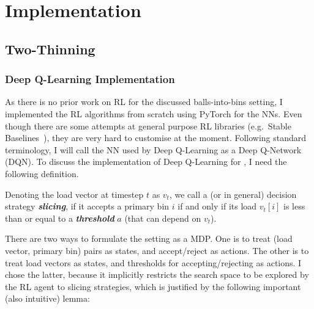 \chapter{Implementation}\label{implementation}

\ifpdf
    \graphicspath{{Chapter3/Figs/Raster/}{Chapter3/Figs/PDF/}{Chapter3/Figs/}}
\else
    \graphicspath{{Chapter3/Figs/Vector/}{Chapter3/Figs/}}
\fi



\section{Two-Thinning}





\subsection{Deep Q-Learning Implementation}


As there is no prior work on RL for the discussed balls-into-bins setting, I implemented the RL algorithms from scratch using PyTorch for the NNs. Even though there are some attempts at general purpose RL libraries (e.g.\ Stable Baselines~\cite{hill2018stablebaselines}), they are very hard to customise at the moment. Following standard terminology, I will call the NN used by Deep Q-Learning as a Deep Q-Network (DQN). To discuss the implementation of Deep Q-Learning for \TwoThinning, I need the following definition.



\begin{definition} 
Denoting the load vector at timestep $t$ as $v_t$, we call a \TwoThinning (or \KThinning in general) decision strategy \textit{\textbf{slicing}}, if it accepts a primary bin $i$ if and only if its load $v_t[i]$ is less than or equal to a \textit{\textbf{threshold}} $a$ (that can depend on $v_t$).
\end{definition}


There are two ways to formulate the \TwoThinning setting as a MDP. One is to treat (load vector, primary bin) pairs as states, and accept/reject as actions. The other is to treat load vectors as states, and thresholds for accepting/rejecting as actions. I chose the latter, because it implicitly restricts the search space to be explored by the RL agent to slicing strategies, which is justified by the following important (also intuitive) lemma:


